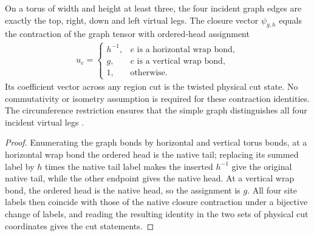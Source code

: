 \begin{lemma}%
    \label{thm:peps_regular_torus_closure_cut_identification}
    \leanok
    On a torus of width and height at least three, the four incident
    graph edges are exactly the top, right, down and left virtual legs.
    The closure vector $\psi_{g,h}$ equals the contraction of
    the graph tensor with ordered-head assignment
    \begin{align}
        u_e=
        \begin{cases}
            h^{-1}, & e\text{ is a horizontal wrap bond}, \\
            g,      & e\text{ is a vertical wrap bond},   \\
            1,      & \text{otherwise}.
        \end{cases}
    \end{align}
    Its coefficient vector across any region cut is the twisted
    physical cut state. No commutativity or isometry assumption is
    required for these contraction identities. The circumference
    restriction ensures that the simple graph distinguishes all four
    incident virtual legs \cite{gap:rmp_peps_quantum_double_g_isometry}.
\end{lemma}

\begin{proof}\leanok
    Enumerating the graph bonds by horizontal and vertical torus bonds,
    at a horizontal wrap bond the ordered head is the native tail;
    replacing its summed label by $h$ times the native tail label makes the inserted $h^{-1}$ give the original native tail, while
    the other endpoint gives the native head. At a vertical wrap bond,
    the ordered head is the native head, so the assignment is $g$.
    All four site labels then coincide with those of the native closure
    contraction under a bijective change of labels, and reading the resulting
    identity in the two sets of physical cut coordinates gives the cut statements.
\end{proof}
